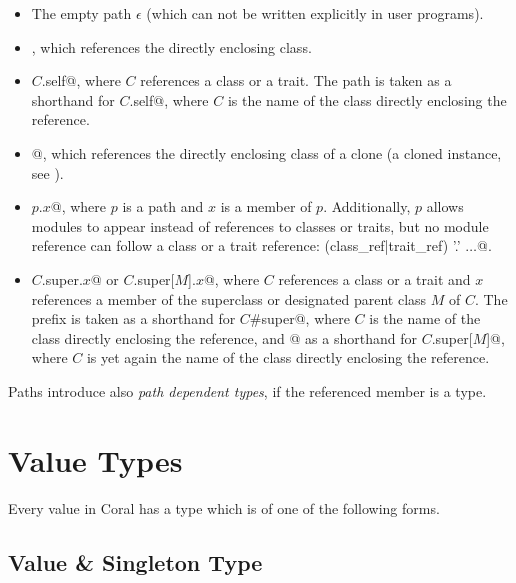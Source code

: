 \begin{itemize}
\item 
The empty path $\epsilon$ (which can not be written explicitly in user programs). 

\item 
{}, which references the directly enclosing class. 

\item 
\lstinline@$C$.self@, where $C$ references a class or a trait. The path  is taken as a shorthand for \lstinline@$C$.self@, where $C$ is the name of the class directly enclosing the reference. 

\item
\lstinline@self[cloned]@, which references the directly enclosing class of a clone (a cloned instance, see ). 

\item 
\lstinline@$p$.$x$@, where $p$ is a path and $x$ is a member of $p$. Additionally, $p$ allows modules to appear instead of references to classes or traits, but no module reference can follow a class or a trait reference:  {(class_ref|trait_ref) '.'} $\ldots$@. 

\item
\lstinline@$C$.super.$x$@ or \lstinline@$C$.super[$M$].$x$@, where $C$ references a class or a trait and $x$ references a member of the superclass or designated parent class $M$ of $C$. The prefix  is taken as a shorthand for \lstinline@$C$#super@, where $C$ is the name of the class directly enclosing the reference, and \lstinline@super[$M$]@ as a shorthand for \lstinline@$C$.super[$M$]@, where $C$ is yet again the name of the class directly enclosing the reference. 
\end{itemize}

Paths introduce also {\em path dependent types}, if the referenced member is a type. 






\section{Value Types}

Every value in Coral has a type which is of one of the following forms. 






\subsection{Value \& Singleton Type}
\label{sec:value-types}
\label{sec:singleton-types}

